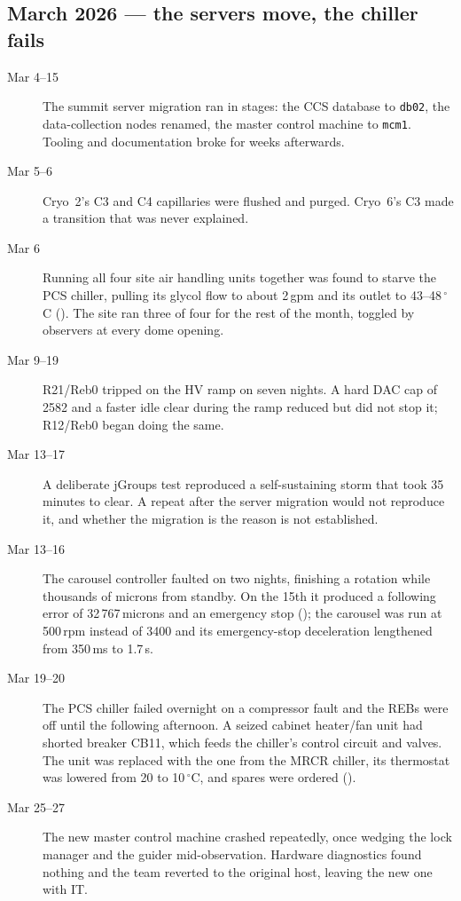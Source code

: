 \subsection{March 2026 --- the servers move, the chiller fails}
\begin{description}

\item[Mar 4--15] The summit server migration ran in stages: the CCS
  database to \texttt{db02}, the data-collection nodes renamed, the
  master control machine to \texttt{mcm1}.  Tooling and documentation
  broke for weeks afterwards.

\item[Mar 5--6] Cryo~2's C3 and C4 capillaries were flushed and purged.
  Cryo~6's C3 made a transition that was never explained.

\item[Mar 6] Running all four site air handling units together was
  found to starve the PCS chiller, pulling its glycol flow to about
  2\,gpm and its outlet to 43--48\,$^{\circ}$C
  ().  The site ran three of four for the rest
  of the month, toggled by observers at every dome opening.

\item[Mar 9--19] R21/Reb0 tripped on the HV ramp on seven nights.  A
  hard DAC cap of 2582 and a faster idle clear during the ramp reduced
  but did not stop it; R12/Reb0 began doing the same.

\item[Mar 13--17] A deliberate jGroups test reproduced a
  self-sustaining storm that took 35 minutes to clear.  A repeat after
  the server migration would not reproduce it, and whether the
  migration is the reason is not established.

\item[Mar 13--16] The carousel controller faulted on two nights,
  finishing a rotation while thousands of microns from standby.  On the
  15th it produced a following error of 32\,767\,microns and an
  emergency stop (); the carousel was run at
  500\,rpm instead of 3400 and its emergency-stop deceleration
  lengthened from 350\,ms to 1.7\,s.

\item[Mar 19--20] The PCS chiller failed overnight on a compressor
  fault and the REBs were off until the following afternoon.  A seized
  cabinet heater/fan unit had shorted breaker CB11, which feeds the
  chiller's control circuit and valves.  The unit was replaced with the
  one from the MRCR chiller, its thermostat was lowered from 20 to
  10\,$^{\circ}$C, and spares were ordered ().

\item[Mar 25--27] The new master control machine crashed repeatedly,
  once wedging the lock manager and the guider mid-observation.
  Hardware diagnostics found nothing and the team reverted to the
  original host, leaving the new one with IT.

\end{description}

